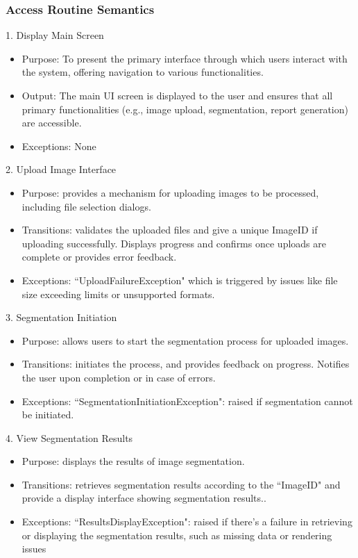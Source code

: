 \documentclass[12pt, titlepage]{article}
\begin{document}
\subsubsection{Access Routine Semantics}
1. Display Main Screen
\begin{itemize}
    \item Purpose: To present the primary interface through which users interact with the system, offering navigation to various functionalities.
    \item Output: The main UI screen is displayed to the user and ensures that all primary functionalities (e.g., image upload, segmentation, report generation) are accessible.
    \item Exceptions: None
\end{itemize} 

2. Upload Image Interface
\begin{itemize}
    \item Purpose: provides a  mechanism for uploading images to be processed, including file selection dialogs.
    \item Transitions: validates the uploaded files and give a unique ImageID if uploading successfully. Displays progress and confirms once uploads are complete or provides error feedback. 
    \item Exceptions: ``UploadFailureException" which is triggered by issues like file size exceeding limits or unsupported formats.
\end{itemize} 

3. Segmentation  Initiation
\begin{itemize}
    \item Purpose: allows users to start the segmentation process for uploaded images.
    \item Transitions: initiates the process, and provides feedback on progress. Notifies the user upon completion or in case of errors.
    \item Exceptions: ``SegmentationInitiationException": raised if segmentation cannot be initiated.
\end{itemize} 


4. View Segmentation Results
\begin{itemize}
    \item Purpose: displays the results of image segmentation.
    \item Transitions: retrieves segmentation results according to the ``ImageID" and provide a display interface showing segmentation results..
    \item Exceptions: ``ResultsDisplayException": raised if there's a failure in retrieving or displaying the segmentation results, such as missing data or rendering issues
\end{itemize}
\end{document}
